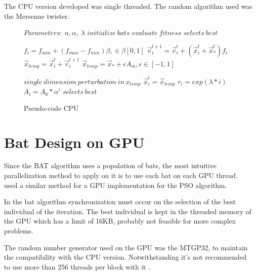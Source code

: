 \documentclass[conference]{IEEEtran}
\begin{document}
The CPU version developed was single threaded.
The random algorithm used was the Mersenne twister.

\begin{figure}
\begin{algorithmic}[1]
\State $Parameters:\ n,\alpha,\ \lambda$
\State $initialize\ bats$
\State $evaluate\ fitness$
\State $selects\ best$

        \State $f_i=f_{min} + (f_{max} - f_{min})\beta, \in \beta [0,1]$
        \State $\vec{v}_i^{t+1} = \vec{v}_i^{t} + (\vec{x}_i^{t} + \vec{x}_*^{t})f_i$
        \State $\vec{x}_{temp} = \vec{x}_i^{t} + \vec{v}_i^{t+1}$
            \State $\vec{x}_{temp} = \vec{x}_* + \epsilon A_m, \epsilon \in [-1, 1]$
        \EndIf

        \State $single\ dimension\ perturbation\ in\ x_{temp}$
            \State $\vec{x}_i^t = \vec{x}_{temp}$
            \State $r_i = exp(\lambda * i)$
            \State $A_i =  A_{0} * \alpha^i$
        \EndIf
        \State $selects\ best$
    \EndFor
\EndWhile
\end{algorithmic}
\caption{Pseudo-code CPU}\label{GPU}
\end{figure}


\section{Bat Design on GPU}

Since the BAT algorithm uses a population of bats, the most intuitive
parallelization method to apply on it is to use each bat on each GPU
thread. \cite{pso-gpu} used a similar method for a GPU implementation
for the PSO algorithm.

In the bat algorithm synchronization must occur on the selection of the
best individual of the iteration. The best individual is kept in the
threaded memory of the GPU which has a limit of 16KB, probably not feasible for
more complex problems.

The random number generator used on the GPU was the MTGP32, to
maintain the compatibility with the CPU version. Notwithstanding
it's not recommended to use more than 256 threads per block with it
\cite{curandIssue}.
\end{document}
